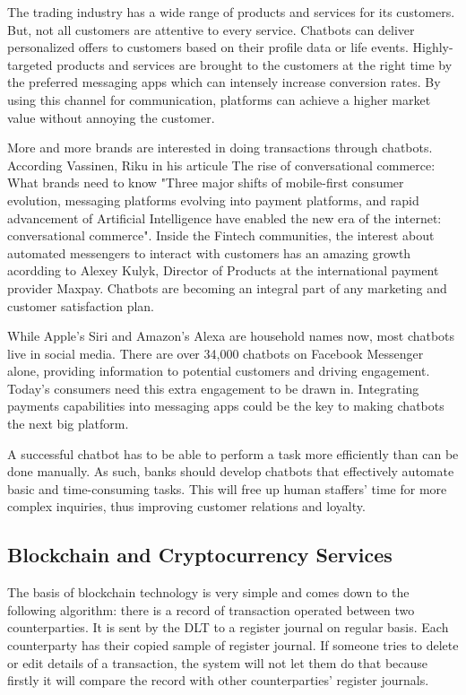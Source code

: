 \documentclass[	DIV=calc,%
							paper=letter,%
							fontsize=12pt%
                            ]{scrartcl}	 					%
\begin{document}
The trading industry has a wide range of products and services for its customers. But, not all customers are attentive to every service. Chatbots can deliver personalized offers to customers based on their profile data or life events. Highly-targeted products and services are brought to the customers at the right time by the preferred messaging apps which can intensely increase conversion rates. By using this channel for communication, platforms can achieve a higher market value without annoying the customer.

More and more brands are interested in doing transactions through chatbots. According Vassinen, Riku in his articule The rise of conversational commerce: What brands need to know "Three major shifts of mobile-first consumer evolution, 
messaging platforms evolving into payment platforms, and rapid advancement of Artificial 
Intelligence have enabled the new era of the internet: conversational commerce". Inside the Fintech communities, the interest about automated messengers to interact with customers has an amazing growth acordding to Alexey Kulyk, Director of Products at the international payment provider Maxpay. Chatbots are becoming an integral part of any marketing and customer satisfaction plan. \cite{vassinen2018rise}

While Apple’s Siri and Amazon’s Alexa are household names now, most chatbots live in social media. There are over 34,000 chatbots on Facebook Messenger alone, providing information to potential customers and driving engagement. Today’s consumers need this extra engagement to be drawn in. Integrating payments capabilities into messaging apps could be the key to making chatbots the next big platform.

A successful chatbot has to be able to perform a task more efficiently than can be done manually. As such, banks should develop chatbots that effectively automate basic and time-consuming tasks. This will free up human staffers' time for more complex inquiries, thus improving customer relations and loyalty.



\subsection{\label{sec:level1}Blockchain and Cryptocurrency Services}
The basis of blockchain technology is very simple and comes down to the following algorithm: there is a record of transaction operated between two counterparties. It is sent by the DLT to a register journal on regular basis. Each counterparty has their copied sample of register journal. If someone tries to delete or edit details of a transaction, the system will not let them do that because firstly it will compare the record with other counterparties’ register journals.
\end{document}

